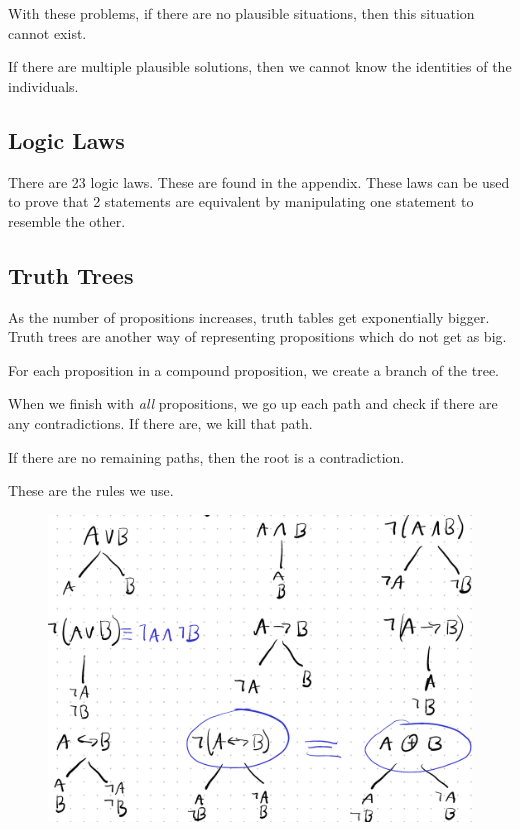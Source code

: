 \documentclass[12pt,letterpaper]{article} \usepackage{amsmath} \usepackage{graphicx}  \usepackage{longtable}  \usepackage{amssymb}
\begin{document}
        With these problems, if there are no plausible situations, then this situation cannot exist. 

        If there are multiple plausible solutions, then we cannot know the identities of the individuals. 

        \subsection{Logic Laws}
        There are 23 logic laws. These are found in the appendix. These laws can be used to prove that 2 statements are equivalent by manipulating one statement to resemble the other. 

        \subsection{Truth Trees}
        As the number of propositions increases, truth tables get exponentially bigger. Truth trees are another way of representing propositions which do not get as big. 

        For each proposition in a compound proposition, we create a branch of the tree. 
        
        When we finish with \emph{all} propositions, we go up each path and check if there are any contradictions. If there are, we kill that path.

        If there are no remaining paths, then the root is a contradiction.

        These are the rules we use. 
        \begin{figure}[H]
            \centering
            \includegraphics[width=0.8\linewidth]{truth_tree.png}
        \end{figure}
\end{document}

